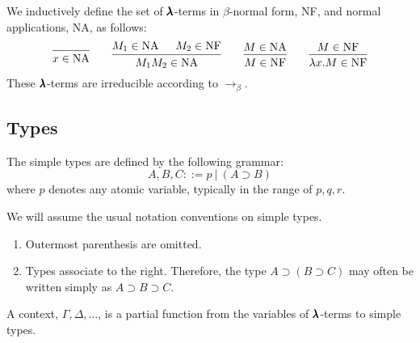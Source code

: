 \begin{definition}
  We inductively define the set of $\pmb{\lambda}$-terms in $\beta$-normal form, NF, and normal applications, NA, as follows:
  \[
    \begin{prooftree}
      \infer0{ x \in \text{NA} } 
    \end{prooftree}
    \qquad
    \begin{prooftree}
      \hypo{ M_1 \in \text{NA} }
      \hypo{ M_2 \in \text{NF} }            
      \infer2{ M_1 M_2 \in \text{NA} } 
    \end{prooftree}
    \qquad
    \begin{prooftree}
      \hypo{ M \in \text{NA} }
      \infer1{ M \in \text{NF} } 
    \end{prooftree}
    \qquad
    \begin{prooftree}
      \hypo{ M \in \text{NF} }
      \infer1{ \lambda x . M \in \text{NF} } 
    \end{prooftree}
  \]
  These $\pmb{\lambda}$-terms are irreducible according to $\to_\beta$.
\end{definition}


\subsection{Types}

\cite{Barendregt2013}

\begin{definition}
  The simple types are defined by the following grammar:  
  \[
    A, B, C ::= p \ | \ (A \supset B)
  \]
  where $p$ denotes any atomic variable, typically in the range of $p, q, r$.
\end{definition}

\begin{notation}
  We will assume the usual notation conventions on simple types. 
  \begin{enumerate}
  \item Outermost parenthesis are omitted.
  \item Types associate to the right. Therefore, the type $A \supset (B \supset C)$ may often be written simply as $A \supset B \supset C$.
  \end{enumerate}
\end{notation}

\begin{definition}[Context]
  A context, $\Gamma, \Delta, \dots$, is a partial function from the variables of $\pmb{\lambda}$-terms to simple types.
\end{definition}

